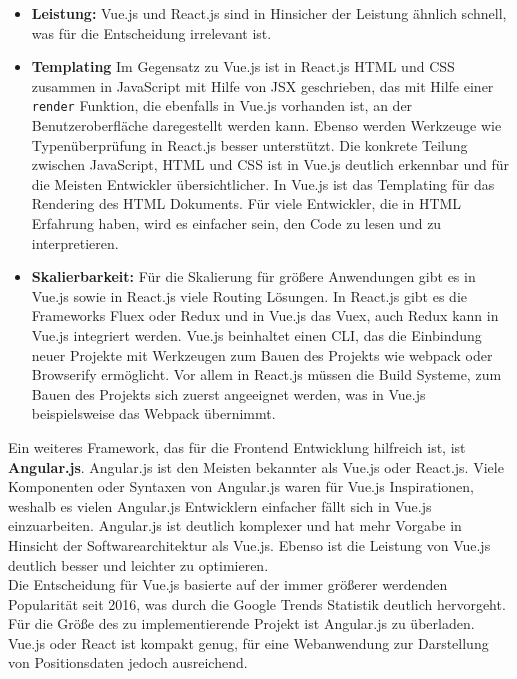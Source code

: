 \begin{itemize}
\item \textbf{Leistung:} Vue.js und React.js sind in Hinsicher der Leistung \"ahnlich schnell, was f\"ur die Entscheidung irrelevant ist\cite{VueDokumentationOther2018}.
\item \textbf{Templating} Im Gegensatz zu Vue.js ist in React.js \ac{HTML} und \ac{CSS} zusammen in JavaScript mit Hilfe von JSX geschrieben, das mit Hilfe einer \texttt{render} Funktion, die ebenfalls in Vue.js vorhanden ist, an der Benutzeroberfl\"ache daregestellt werden kann. Ebenso werden Werkzeuge wie Typen\"uberpr\"ufung in React.js besser unterst\"utzt\cite{VueDokumentationOther2018}. Die konkrete Teilung zwischen JavaScript, \ac{HTML} und \ac{CSS} ist in Vue.js deutlich erkennbar und f\"ur die Meisten Entwickler \"ubersichtlicher\cite{Haupt2018}. In Vue.js ist das Templating f\"ur das Rendering des \ac{HTML} Dokuments. F\"ur viele Entwickler, die in \ac{HTML} Erfahrung haben, wird es einfacher sein, den Code zu lesen und zu interpretieren\cite{VueDokumentationOther2018}.
\item \textbf{Skalierbarkeit:} F\"ur die Skalierung f\"ur gr\"o\ss{}ere Anwendungen gibt es in Vue.js sowie in React.js viele Routing L\"osungen. In React.js gibt es die Frameworks Fluex oder Redux und in Vue.js das Vuex, auch Redux kann in Vue.js integriert werden\cite{Peters2017}. Vue.js beinhaltet einen \ac{CLI}, das die Einbindung neuer Projekte mit Werkzeugen zum Bauen des Projekts wie webpack oder Browserify erm\"oglicht.
Vor allem in React.js m\"ussen die Build Systeme, zum Bauen des Projekts sich zuerst angeeignet werden, was in Vue.js beispielsweise das Webpack \"ubernimmt\cite{VueDokumentationOther2018}.
\end{itemize}
Ein weiteres Framework, das f\"ur die Frontend Entwicklung hilfreich ist, ist \textbf{Angular.js}. Angular.js ist den Meisten bekannter als Vue.js oder React.js. Viele Komponenten oder Syntaxen von Angular.js waren f\"ur Vue.js Inspirationen, weshalb es vielen Angular.js Entwicklern einfacher f\"allt sich in Vue.js einzuarbeiten. Angular.js ist deutlich komplexer und hat mehr Vorgabe in Hinsicht der Softwarearchitektur als Vue.js. Ebenso ist die Leistung von Vue.js deutlich besser und leichter zu optimieren. \\
Die Entscheidung f\"ur Vue.js basierte auf der immer gr\"o\ss{}erer werdenden Popularit\"at seit 2016, was durch die Google Trends Statistik deutlich hervorgeht\cite{GoogleTrends2018}.  F\"ur die Gr\"o\ss{}e des zu implementierende Projekt ist Angular.js zu \"uberladen. Vue.js oder React ist kompakt genug, f\"ur eine Webanwendung zur Darstellung von Positionsdaten jedoch ausreichend. %
